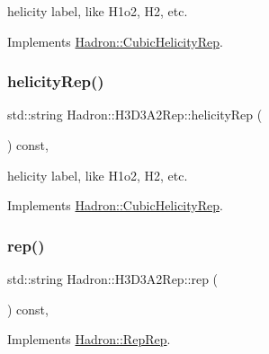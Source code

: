 helicity label, like H1o2, H2, etc. 

Implements \mbox{\hyperlink{structHadron_1_1CubicHelicityRep_af1096946b7470edf0a55451cc662f231}{Hadron\+::\+Cubic\+Helicity\+Rep}}.

\mbox{\label{structHadron_1_1H3D3A2Rep_adb8dca7dffaed3e2601a160205d6d23c}} 
\subsubsection{\texorpdfstring{helicityRep()}{helicityRep()}\hspace{0.1cm}{\footnotesize\ttfamily [3/3]}}
{\footnotesize\ttfamily std\+::string Hadron\+::\+H3\+D3\+A2\+Rep\+::helicity\+Rep (\begin{DoxyParamCaption}{ }\end{DoxyParamCaption}) const\hspace{0.3cm}{\ttfamily [inline]}, {\ttfamily [virtual]}}

helicity label, like H1o2, H2, etc. 

Implements \mbox{\hyperlink{structHadron_1_1CubicHelicityRep_af1096946b7470edf0a55451cc662f231}{Hadron\+::\+Cubic\+Helicity\+Rep}}.

\mbox{\label{structHadron_1_1H3D3A2Rep_a2634fb1518fc2bc1d80d435e4e83aff3}} 
\subsubsection{\texorpdfstring{rep()}{rep()}\hspace{0.1cm}{\footnotesize\ttfamily [1/5]}}
{\footnotesize\ttfamily std\+::string Hadron\+::\+H3\+D3\+A2\+Rep\+::rep (\begin{DoxyParamCaption}{ }\end{DoxyParamCaption}) const\hspace{0.3cm}{\ttfamily [inline]}, {\ttfamily [virtual]}}



Implements \mbox{\hyperlink{structHadron_1_1RepRep_ab3213025f6de249f7095892109575fde}{Hadron\+::\+Rep\+Rep}}.

\mbox{\label{structHadron_1_1H3D3A2Rep_a2634fb1518fc2bc1d80d435e4e83aff3}} 
